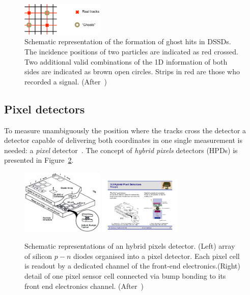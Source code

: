  \begin{figure}[htbp]
   \centering
  \includegraphics[width=0.35\textwidth]{ghosts.pdf} 
      \caption{\label{fig:ghosts} Schematic representation of the formation of ghost hits in 
     DSSDs. The incidence positions of two particles are indicated as  red 
      crossed. Two additional valid combinations of the 1D information of both sides are indicated 
      as brown open circles. Strips in red are those who recorded a signal. (After~\cite{Krammer})}
\end{figure}


\subsection{Pixel detectors}
\label{sec:pixels}
To measure unambiguously the position where the tracks cross the detector a detector capable 
of delivering both coordinates in one single measurement is needed: a {\it pixel} detector~\cite{Pixels}.
The concept of {\it hybrid pixels} detectors (HPDs) is presented in Figure~\ref{fig:pixels}. 
 \begin{figure}[htbp]
   \centering
  \includegraphics[width=0.35\textwidth]{HPD.pdf} 
    \includegraphics[width=0.35\textwidth]{pixel_bb_roc.pdf} 
      \caption{\label{fig:pixels} Schematic representations of an hybrid pixels detector. (Left) array 
      of silicon $p-n$ diodes organised into a pixel detector. Each pixel cell is readout by a dedicated 
      channel of the front-end electronics.(Right) detail of one pixel sensor cell connected via bump 
      bonding to its front end electronics channel. (After~\cite{Pixels,Pixels2003})}
\end{figure}
